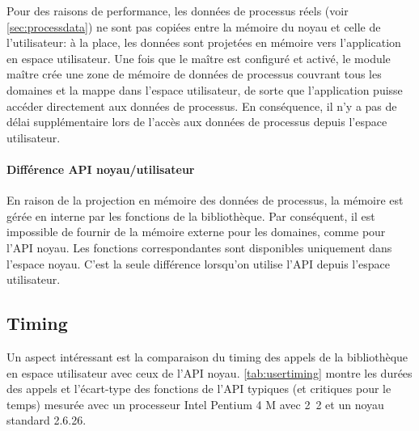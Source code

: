 \documentclass[a4paper,12pt,BCOR=6mm,bibtotoc,idxtotoc]{scrbook}
\begin{document}
Pour des raisons de performance, les donn\'ees de processus r\'eels
(voir \autoref{sec:processdata}) ne sont pas copi\'ees entre la
m\'emoire du noyau et celle de l'utilisateur: \`a la place, les
donn\'ees sont projet\'ees en m\'emoire vers l'application en espace
utilisateur.  Une fois que le ma\^itre est configur\'e et activ\'e, le
module ma\^itre cr\'ee une zone de m\'emoire de donn\'ees de processus
couvrant tous les domaines et la mappe dans l'espace utilisateur, de
sorte que l'application puisse acc\'eder directement aux donn\'ees de
processus. En cons\'equence, il n'y a pas de d\'elai suppl\'ementaire lors
de l'acc\`es aux donn\'ees de processus depuis l'espace utilisateur.

\paragraph{Diff\'erence API noyau/utilisateur}
En raison de la projection en m\'emoire des donn\'ees de processus, la
m\'emoire est g\'er\'ee en interne par les fonctions de la biblioth\`eque.
Par cons\'equent, il est impossible de fournir de la m\'emoire externe
pour les domaines, comme pour l'API noyau.  Les fonctions
correspondantes sont disponibles uniquement dans l'espace noyau.
C'est la seule diff\'erence lorsqu'on utilise l'API depuis l'espace
utilisateur.

\subsection{Timing}
\label{sec:usertiming}

Un aspect int\'eressant est la comparaison du timing des appels de la
biblioth\`eque en espace utilisateur avec ceux de l'API noyau.
\autoref{tab:usertiming} montre les dur\'ees des appels et l'\'ecart-type
des fonctions de l'API typiques (et critiques pour le temps) mesur\'ee
avec un processeur Intel Pentium 4 M avec \unit{2.2}{\giga\hertz} et
un noyau standard 2.6.26.
\end{document}
